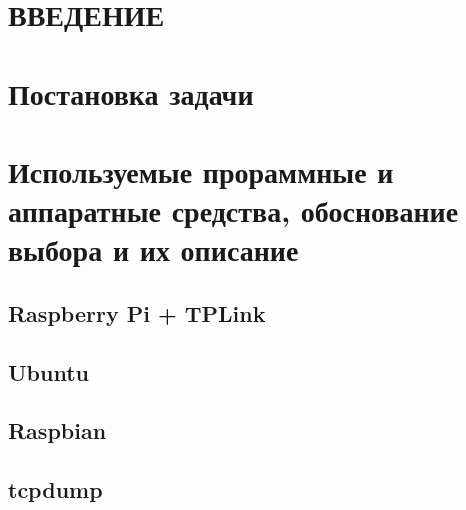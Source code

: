 






\newpage
{}
\tableofcontents



\newpage
{}
\setcounter{section}{0}
\section*{ВВЕДЕНИЕ}


\section{Постановка задачи}
\setcounter{figure}{0}


\section{Используемые прораммные и аппаратные средства, обоснование выбора и их описание}
\setcounter{figure}{0}
\subsection{Raspberry Pi + TPLink}
%
\subsection{Ubuntu}
%
\subsection{Raspbian}
%
\subsection{tcpdump}
%
